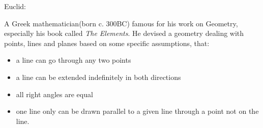 Euclid:
\par
A Greek mathematician(born c. 300BC) famous for his work on Geometry, especially his book called \emph{The Elements}.
He devised a geometry dealing with points, lines and planes based on some specific assumptions,  that:
\begin{itemize}
\item a line can go through any two points  
\item a line can be extended indefinitely in both directions
\item all right angles are equal
\item one line only can be drawn parallel to a given line through a point not on the line.
\end{itemize}  
  